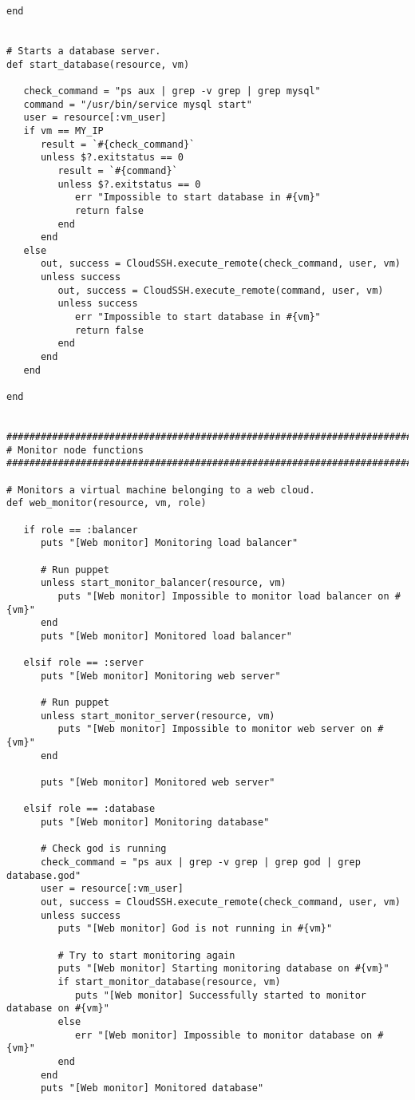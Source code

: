 \begin{lstlisting}
end


# Starts a database server.
def start_database(resource, vm)
   
   check_command = "ps aux | grep -v grep | grep mysql"
   command = "/usr/bin/service mysql start"
   user = resource[:vm_user]
   if vm == MY_IP
      result = `#{check_command}`
      unless $?.exitstatus == 0
         result = `#{command}`
         unless $?.exitstatus == 0
            err "Impossible to start database in #{vm}"
            return false
         end
      end
   else
      out, success = CloudSSH.execute_remote(check_command, user, vm)
      unless success
         out, success = CloudSSH.execute_remote(command, user, vm)
         unless success
            err "Impossible to start database in #{vm}"
            return false
         end
      end
   end
   
end


################################################################################
# Monitor node functions
################################################################################

# Monitors a virtual machine belonging to a web cloud.
def web_monitor(resource, vm, role)

   if role == :balancer
      puts "[Web monitor] Monitoring load balancer"
      
      # Run puppet
      unless start_monitor_balancer(resource, vm)
         puts "[Web monitor] Impossible to monitor load balancer on #{vm}"
      end
      puts "[Web monitor] Monitored load balancer"

   elsif role == :server
      puts "[Web monitor] Monitoring web server"
      
      # Run puppet
      unless start_monitor_server(resource, vm)
         puts "[Web monitor] Impossible to monitor web server on #{vm}"
      end
      
      puts "[Web monitor] Monitored web server"
      
   elsif role == :database
      puts "[Web monitor] Monitoring database"
      
      # Check god is running
      check_command = "ps aux | grep -v grep | grep god | grep database.god"
      user = resource[:vm_user]
      out, success = CloudSSH.execute_remote(check_command, user, vm)
      unless success
         puts "[Web monitor] God is not running in #{vm}"
         
         # Try to start monitoring again
         puts "[Web monitor] Starting monitoring database on #{vm}"
         if start_monitor_database(resource, vm)
            puts "[Web monitor] Successfully started to monitor database on #{vm}"
         else
            err "[Web monitor] Impossible to monitor database on #{vm}"
         end
      end
      puts "[Web monitor] Monitored database"


\end{lstlisting}

